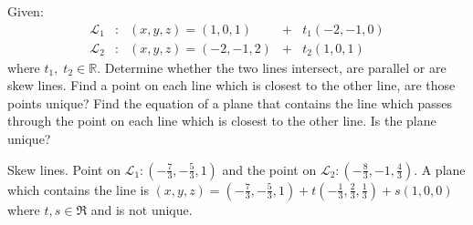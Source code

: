 
\begin{Exercise}[
name={},
title={}, 
difficulty=0,
origin={\cite{YL}}]
Given:
\[
\begin{array}{lllllllll}
\mathcal{L}_1 & : &  (x, y, z)=(1, 0, 1) & + & t_1(-2, -1, 0)\\
\mathcal{L}_2 & : &  (x, y, z)=(-2, -1, 2) & + & t_2(1, 0, 1) 
\end{array}
\]
where $t_1,\;t_2\in\mathbb{R}$.
\Question Determine whether the two lines intersect, are parallel or are skew lines.
\Question Find a point on each line which is closest to the other line, are those points unique?
\Question Find the equation of a plane that contains the line which passes through the point on each line which is closest to the other line. Is the plane unique?
\end{Exercise}

\begin{Answer}
\Question Skew lines.
\Question Point on $\mathcal{L}_1: (-\frac73, -\frac53,1)$ and the point on $\mathcal{L}_2: (-\frac83,-1,\frac43)$.
\Question A plane which contains the line is $(x,y,z)=(-\frac73,-\frac53,1)+t(-\frac13, \frac23,\frac13)+s(1,0,0)$ where $t,s\in\Re$ and is not unique. 
\end{Answer}
